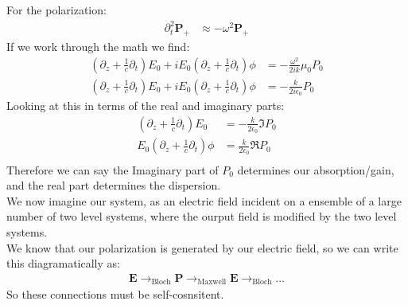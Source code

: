 For the polarization:
\begin{align*}
	\partial_t^2\bm{P}_+ &\approx -\omega^2\bm{P}_+
\end{align*}
If we work through the math we find:
\begin{align*}
	\left(\partial_z + \frac{1}{c}\partial_t\right)E_0 + iE_0\left(\partial_z + \frac{1}{c}\partial_t\right)\phi &= -\frac{\omega^2}{2ik}\mu_0P_0 \\
	\left(\partial_z + \frac{1}{c}\partial_t\right)E_0 + iE_0\left(\partial_z + \frac{1}{c}\partial_t\right)\phi &= -\frac{k}{2i\epsilon_0}P_0
\end{align*}
Looking at this in terms of the real and imaginary parts:
\begin{align*}
	\left(\partial_z + \frac{1}{c}\partial_t\right)E_0 &= -\frac{k}{2\epsilon_0} \Im P_0 \\
	E_0\left(\partial_z + \frac{1}{c}\partial_t\right)\phi &= \frac{k}{2\epsilon_0} \Re P_0 \\
\end{align*}
Therefore we can say the Imaginary part of $P_0$ determines our absorption/gain, and the real part determines the dispersion.\\
We now imagine our system, as an electric field incident on a ensemble of a large number of two level systems, where the ourput field is modified by the two level systems. \\
We know that our polarization is generated by our electric field, so we can write this diagramatically as:
\begin{align*}
	\bm{E} \to_{\text{Bloch}} \bm{P} \to_{\text{Maxwell}} \bm{E} \to_\text{Bloch} \ldots
\end{align*}
So these connections must be self-cosnsitent. \\
